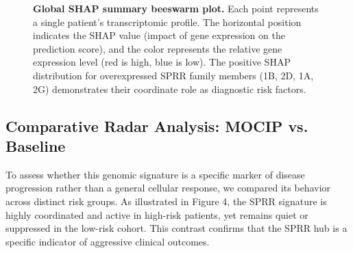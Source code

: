 \documentclass[11pt]{article}
\begin{document}
\begin{figure}[h]
\caption{\textbf{Global SHAP summary beeswarm plot.} Each point represents a single patient's transcriptomic profile. The horizontal position indicates the SHAP value (impact of gene expression on the prediction score), and the color represents the relative gene expression level (red is high, blue is low). The positive SHAP distribution for overexpressed SPRR family members (1B, 2D, 1A, 2G) demonstrates their coordinate role as diagnostic risk factors.}
\label{fig:mocip_shap_beeswarm}
\end{figure}

\subsection{Comparative Radar Analysis: MOCIP vs. Baseline}

To assess whether this genomic signature is a specific marker of disease progression rather than a general cellular response, we compared its behavior across distinct risk groups. As illustrated in Figure 4, the SPRR signature is highly coordinated and active in high-risk patients, yet remains quiet or suppressed in the low-risk cohort. This contrast confirms that the SPRR hub is a specific indicator of aggressive clinical outcomes.
\end{document}
